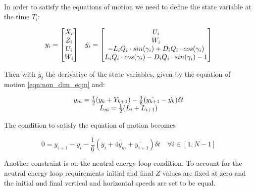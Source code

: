 In order to satisfy the equations of motion we need to define the state variable at the time $T_i$:

\begin{equation}
	\begin{array}[c]{cc}
	  y_i= \begin{bmatrix}
	    X_i \\
	    Z_i \\
	    U_i \\
	    W_i 
	  \end{bmatrix} &

	  \dot{y_i} = 
	  \begin{bmatrix}
	    U_i \\
	    W_i \\
	    -L_i Q_i \cdot sin(\gamma_i) + D_i Q_i \cdot cos(\gamma_i) \\
	    L_i Q_i  \cdot cos(\gamma_i ) - D_i Q_i  \cdot sin(\gamma_i ) - 1
	  \end{bmatrix}
	\end{array}
  \label{eqn:state_i}
\end{equation}

Then with $\dot{y_i}$ the derivative of the state variables, given by the equation of motion \ref{eqn:non_dim_eqm} and:

\begin{equation}
  \begin{array}[c]{c}
    y_m= \frac{1}{2}(y_k + Y_{k+1}) - \frac{1}{8}(\dot{y_{k+1}} - \dot{y_k})\delta t \\
    L_m=\frac{1}{2}(L_i + L_{i+1})
  \end{array}
  \label{eqn:simpson_middle}
\end{equation}

The condition to satisfy the equation of motion becomes

\begin{equation}
  0=y_{i+1} - y_i - \frac{1}{6}( \dot{y_i} + 4 \dot{y_m} + \dot{y_{i+1}})\delta t \quad \forall i \in [1,N-1]
  \label{eqn:simpson}
\end{equation}

\par Another constraint is on the neutral energy loop condition.
To account for the neutral energy loop requirements initial and final $Z$ values are fixed at zero and the initial and final vertical and horizontal speeds are set to be equal.

